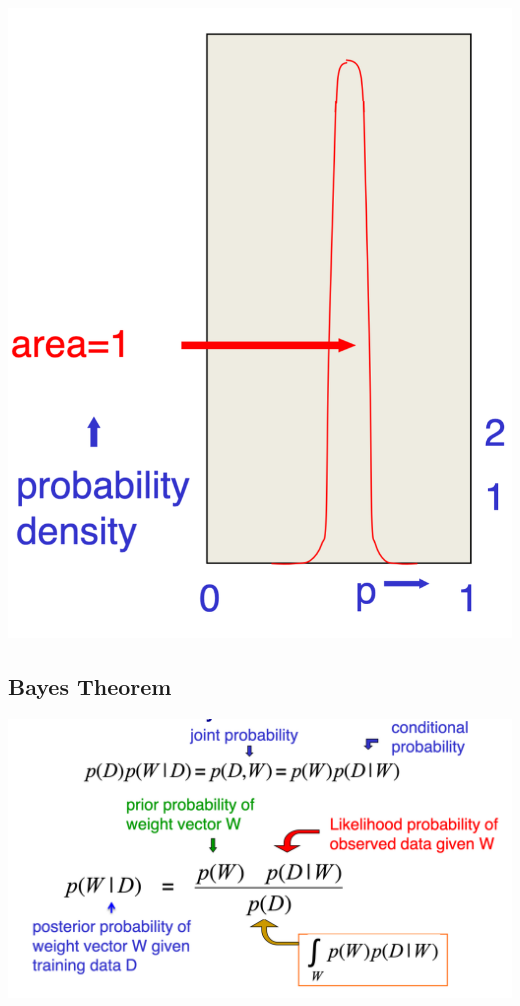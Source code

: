 \documentclass[11pt]{article}
\theoremstyle{definition}
\begin{document}
\includegraphics[width=\textwidth/3]{8.png}

\subsection{Bayes Theorem}
\includegraphics[width=\textwidth/2]{10.png}
\end{document}
